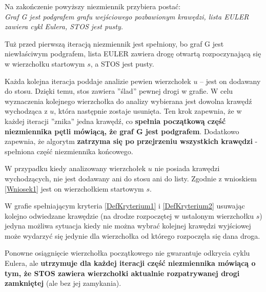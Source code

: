 Na zakończenie powyższy niezmiennik przybiera postać: \\
\textit{Graf G jest podgrafem grafu wejściowego pozbawionym krawędzi, lista EULER zawiera cykl Eulera, STOS jest pusty.}

Tuż przed pierwszą iteracją niezmiennik jest spełniony, bo graf G jest niewłaściwym podgrafem, lista EULER zawiera drogę otwartą rozpoczynającą się w wierzchołku startowym $s$, a STOS jest pusty.

Każda kolejna iteracja poddaje analizie pewien wierzchołek $u$ -- jest on dodawany do stosu.
Dzięki temu, stos zawiera ''ślad'' pewnej drogi w grafie. 
W celu wyznaczenia kolejnego wierzchołka do analizy wybierana jest dowolna krawędź wychodząca z $u$, która następnie zostaje usunięta.
Ten krok zapewnia, że w każdej iteracji ''znika'' jedna krawędź, co \textbf{spełnia początkową część niezmiennika pętli mówiącą, że graf G jest podgrafem}. Dodatkowo zapewnia, że algorytm \textbf{zatrzyma się po przejrzeniu wszystkich krawędzi} - spełniona część niezmiennika końcowego.

W przypadku kiedy analizowany wierzchołek $u$ nie posiada krawędzi wychodzących, nie jest dodawany ani do stosu ani do listy. Zgodnie z wnioskiem \ref{Wniosek1} jest on wierzchołkiem startowym $s$.
\begin{concl}
\label{Wniosek1}
W grafie spełniającym kryteria \ref{DefKryterium1} i \ref{DefKryterium2} usuwając kolejno odwiedzane krawędzie (na drodze rozpoczętej w ustalonym wierzchołku $s$) jedyna możliwa sytuacja kiedy nie można wybrać kolejnej krawędzi wyjściowej może wydarzyć się jedynie dla wierzchołka od którego rozpoczęła się dana droga.
\end{concl}

Ponowne osiągnięcie wierzchołka początkowego nie gwarantuje odkrycia cyklu Eulera, ale \textbf{utrzymuje dla każdej iteracji część niezmiennika mówiącą o tym, że STOS zawiera wierzchołki aktualnie rozpatrywanej drogi zamkniętej} (ale bez jej zamykania).

